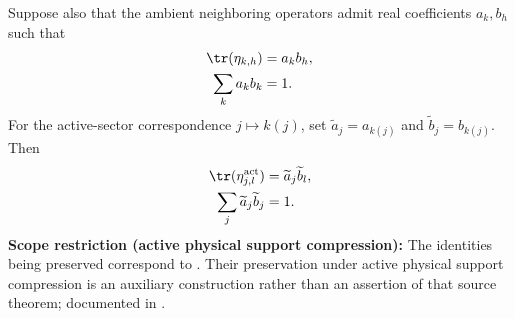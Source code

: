 \begin{lemma}
    Suppose also that the ambient neighboring operators admit real
    coefficients $a_k,b_h$ such that
    \begin{align}
        \tr(\eta_{k,h}) & =a_kb_h,
        \notag                     \\
        \sum_k a_kb_k   & =1.
        \notag
    \end{align}
    For the active-sector correspondence $j\mapsto k(j)$, set
    $\widetilde a_j=a_{k(j)}$ and $\widetilde b_j=b_{k(j)}$.  Then
    \begin{align}
        \tr(\eta^{\mathrm{act}}_{j,l})
         & =\widetilde a_j\widetilde b_l,
        \notag                            \\
        \sum_j\widetilde a_j\widetilde b_j
         & =1.
        \notag
    \end{align}
    \textbf{Scope restriction (active physical support compression):}
    The identities being preserved correspond to
    \cite[Theorem~4.9(iv), lines~864--889]{Cirac2016MPDO_arXiv}. Their
    preservation under active physical support compression is an auxiliary
    construction rather than an assertion of that source theorem; documented in
    \cite{gap:cpsv16_active_physical_support_compression}.
\end{lemma}

